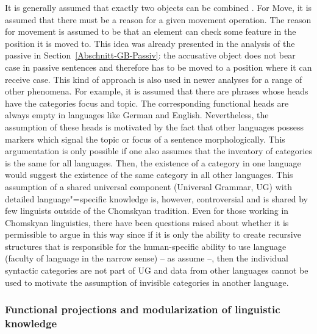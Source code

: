 \enlargethispage{5pt}
It is generally assumed that exactly two objects can be combined \citep[]{Chomsky95a-u}.
For Move, it is assumed that there must be a reason for a given movement operation. The reason for
movement is assumed to be that an element can check some feature in the position it is moved to. This idea was already presented in the analysis of the passive in
Section~\ref{Abschnitt-GB-Passiv}: the accusative object does not bear case in passive sentences and therefore has to be moved to a position
where it can receive case. This kind of approach is also used in newer analyses for a range of other phenomena. For example, it is assumed that
there are phrases whose heads have the categories focus and topic. The
corresponding functional heads are always empty in languages like German and English.
Nevertheless, the assumption of these heads is motivated by the fact that other languages possess
markers which signal the topic or focus of a sentence morphologically. This argumentation is only
possible if one also assumes that the inventory of categories is the same for all languages. Then,
the existence of a category in one language would suggest the existence of the same category in all
other languages. This assumption of a shared universal component (Universal Grammar, UG)\indexug
with detailed language"=specific knowledge is, however, controversial and is shared by few linguists
outside of the Chomskyan tradition. Even for those working in Chomskyan linguistics, there have been
questions raised about whether it is permissible to argue in this way since if it is only the ability to create recursive structures that is responsible for the
human-specific ability to use language (faculty of language in the narrow sense) -- as \citet*{HCF2002a}
assume --, then the individual syntactic categories are not part of UG and data from other languages cannot be used
to motivate the assumption of invisible categories in another language.

\subsubsection{Functional projections and modularization of linguistic knowledge}
\label{section-functional-projections-modularization}

